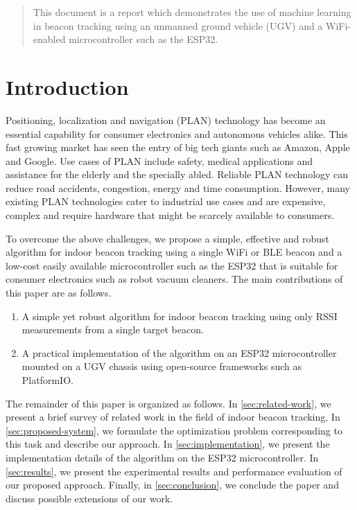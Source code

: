 \documentclass[conference]{IEEEtran}
\begin{document}
\begin{abstract}
    This document is a report which demonstrates the use of machine learning in
    beacon tracking using an unmanned ground vehicle (UGV) and a WiFi-enabled
    microcontroller such as the ESP32.
\end{abstract}

\section{Introduction}
\label{sec:intro}
Positioning, localization and navigation (PLAN) technology has become an
essential capability for consumer electronics and autonomous vehicles alike.
This fast growing market has seen the entry of big tech giants such as Amazon,
Apple and Google. Use cases of PLAN include safety, medical applications and
assistance for the elderly and the specially abled. Reliable PLAN technology can
reduce road accidents, congestion, energy and time consumption. However, many
existing PLAN technologies cater to industrial use cases and are expensive,
complex and require hardware that might be scarcely available to consumers. 

To overcome the above challenges, we propose a simple, effective and robust
algorithm for indoor beacon tracking using a single WiFi or BLE beacon and a
low-cost easily available microcontroller such as the ESP32 that is suitable for
consumer electronics such as robot vacuum cleaners. The main contributions of
this paper are as follows.

\begin{enumerate}
    \item A simple yet robust algorithm for indoor beacon tracking using only
    RSSI measurements from a single target beacon.
    \item A practical implementation of the algorithm on an ESP32
    microcontroller mounted on a UGV chassis using open-source frameworks such
    as PlatformIO.
\end{enumerate}

The remainder of this paper is organized as follows. In
\autoref{sec:related-work}, we present a brief survey of related work in the
field of indoor beacon tracking. In \autoref{sec:proposed-system}, we formulate
the optimization problem corresponding to this task and describe our approach.
In \autoref{sec:implementation}, we present the implementation details of the
algorithm on the ESP32 microcontroller. In \autoref{sec:results}, we present the
experimental results and performance evaluation of our proposed approach.
Finally, in \autoref{sec:conclusion}, we conclude the paper and discuss possible
extensions of our work.
\end{document}
